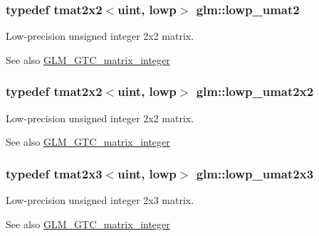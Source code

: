 \subsubsection[{lowp\+\_\+umat2}]{\setlength{\rightskip}{0pt plus 5cm}typedef tmat2x2$<${\bf uint}, lowp$>$ {\bf glm\+::lowp\+\_\+umat2}}\label{group__gtc__matrix__integer_ga0ff71fefa5bfab1462195c3de4f83f67}
Low-\/precision unsigned integer 2x2 matrix. \begin{DoxySeeAlso}{See also}
\hyperlink{group__gtc__matrix__integer}{G\+L\+M\+\_\+\+G\+T\+C\+\_\+matrix\+\_\+integer} 
\end{DoxySeeAlso}
\hypertarget{group__gtc__matrix__integer_ga13b2812e9b0af47e0f498391383d145a}{}
\subsubsection[{lowp\+\_\+umat2x2}]{\setlength{\rightskip}{0pt plus 5cm}typedef tmat2x2$<${\bf uint}, lowp$>$ {\bf glm\+::lowp\+\_\+umat2x2}}\label{group__gtc__matrix__integer_ga13b2812e9b0af47e0f498391383d145a}
Low-\/precision unsigned integer 2x2 matrix. \begin{DoxySeeAlso}{See also}
\hyperlink{group__gtc__matrix__integer}{G\+L\+M\+\_\+\+G\+T\+C\+\_\+matrix\+\_\+integer} 
\end{DoxySeeAlso}
\hypertarget{group__gtc__matrix__integer_ga3af254ecb450000314422b1730afacc0}{}
\subsubsection[{lowp\+\_\+umat2x3}]{\setlength{\rightskip}{0pt plus 5cm}typedef tmat2x3$<${\bf uint}, lowp$>$ {\bf glm\+::lowp\+\_\+umat2x3}}\label{group__gtc__matrix__integer_ga3af254ecb450000314422b1730afacc0}
Low-\/precision unsigned integer 2x3 matrix. \begin{DoxySeeAlso}{See also}
\hyperlink{group__gtc__matrix__integer}{G\+L\+M\+\_\+\+G\+T\+C\+\_\+matrix\+\_\+integer} 
\end{DoxySeeAlso}
\hypertarget{group__gtc__matrix__integer_gad5e8f08c103d5dd33767e31938357aa6}{}
